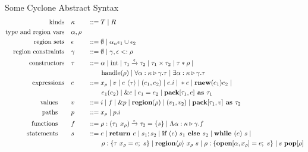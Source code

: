 \documentclass[aspectratio=169]{beamer}
\begin{document}
\begin{frame}{Some Cyclone Abstract Syntax}
\scriptsize{
\begin{alignat*}{2}
\text{kinds}\quad &\kappa &&::= T \altm R
\\
\text{type and region vars}\quad &\alpha,\rho &&
\\
\text{region sets}\quad &\epsilon &&::= \emptyset \altm \alpha_n \epsilon_1 \cup \epsilon_2
\\
\text{region constraints} \quad &\gamma &&::= \emptyset \altm \gamma, \epsilon <: \rho
\\
\text{constructors} \quad &\tau &&::= \alpha \altm \text{int} \altm \tau_1 \xrightarrow[]{\epsilon} \tau_2 \altm \tau_1 \times \tau_2 \altm \tau \ast \rho \altm
\\
~ & ~ && \qquad \text{handle}(\rho) \altm \forall\alpha:\kappa \triangleright \gamma.\tau \altm \exists \alpha:\kappa \triangleright \gamma.\tau
\\
\text{expressions} \quad &e &&::= x_\rho \altm v \altm e\ \langle\tau\rangle \altm (e_1,e_2) \altm e.i \altm \ast e \altm \textbf{rnew}(e_1)e_2 \altm
\\
~ & ~ && \qquad e_1(e_2) \altm \&e \altm e_1 = e_2 \altm \textbf{pack} [\tau_1, e]\textbf{ as } \tau_1
\\
\text{values} \qquad &v &&::= i \altm f \altm \&p \altm \textbf{region}(\rho) \altm (v_1, v_2) \altm \textbf{pack}[\tau_1,v]\textbf{ as } \tau_2
\\
\text{paths} \qquad &p &&::= x_\rho \altm p.i
\\
\text{functions} \qquad &f &&::= \rho:(\tau_1\ x_{\rho}) \xrightarrow[]{\epsilon} \tau_2 = \{s\} \altm \Lambda\alpha:\kappa \triangleright \gamma.f
\\
\text{statements} \qquad &s &&::= e \altm \textbf{return } e \altm s_1;s_2 \altm \textbf{if } (e)\ s_1 \textbf{ else } s_2 \altm \textbf{while } (e)\ s \altm
\\
~ & ~ && \qquad \rho:\{\tau\ x_\rho = e;\ s\} \altm \textbf{region}\langle\rho\rangle\ x_{\rho}\ s \altm \rho:\{\textbf{open}[\alpha,x_{\rho}] = e;\ s\} \altm s\ \textbf{pop}[\rho]
\end{alignat*}
    }
\end{frame}
\end{document}
